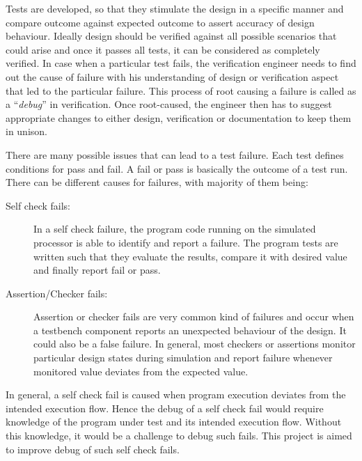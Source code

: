 Tests are developed, so that they stimulate the design in a specific manner and compare outcome against expected outcome to assert accuracy of design behaviour. Ideally design should be verified against all possible scenarios that could arise and once it passes all tests, it can be considered as completely verified. In case when a particular test fails, the verification engineer needs to find out the cause of failure with his understanding of design or verification aspect that led to the particular failure. This process of root causing a failure is called as a ``{\it debug}'' in verification. Once root-caused, the engineer then has to suggest appropriate changes to either design, verification or documentation to keep them in unison. 

There are many possible issues that can lead to a test failure. Each test defines conditions for pass and fail. A fail or pass is basically the outcome of a test run. There can be different causes for failures, with majority of them being:

\begin{description}
	\item[Self check fails:] In a self check failure, the program code running on the simulated processor is able to identify and report a failure. The program tests are written such that they evaluate the results, compare it with desired value and finally report fail or pass. 
	\item[Assertion/Checker fails:] Assertion or checker fails are very common kind of failures and occur when a testbench component reports an unexpected behaviour of the design. It could also be a false failure. In general, most checkers or assertions monitor particular design states during simulation and report failure whenever monitored value deviates from the expected value. 
\end{description}

In general, a self check fail is caused when program execution deviates from the intended execution flow. Hence the debug of a self check fail would require knowledge of the program under test and its intended execution flow. Without this knowledge, it would be a challenge to debug such fails. This project is aimed to improve debug of such self check fails.

%
%
%

